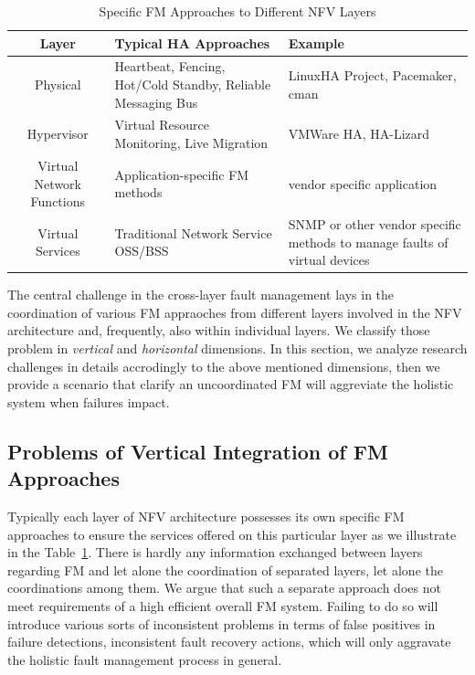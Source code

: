 \label{problemstatement}

\begin{table}[!t]
\centering
\caption{Specific FM Approaches to Different NFV Layers}
\label{tbl:layers}
	\begin{tabular}{c|p{3cm}|p{5cm}}
		\hline
		\textbf{Layer} & \textbf{Typical HA Approaches} & \textbf{Example}\\
		\hline
		\hline
		Physical	&	Heartbeat, Fencing, Hot/Cold Standby, Reliable Messaging Bus &
LinuxHA Project, Pacemaker, cman \\
		Hypervisor & Virtual Resource Monitoring, Live Migration & VMWare HA, HA-Lizard \\
		Virtual Network Functions & Application-specific FM methods & vendor
specific application \\
		Virtual Services & Traditional Network Service OSS/BSS & SNMP or other
vendor specific methods to manage faults of virtual devices \\
\hline
	\end{tabular}
\end{table} 
 
The central challenge in the cross-layer fault management lays in the coordination
of various FM appraoches from different layers involved in the NFV architecture
and, frequently, also within individual layers. We classify those problem in
\emph{vertical} and \emph{horizontal} dimensions. In this section, we analyze
research challenges in details accrodingly to the above mentioned dimensions,
then we provide a scenario that clarify an uncoordinated FM will aggreviate the
holistic system when failures impact. 

\subsection{Problems of Vertical Integration of FM Approaches} 

Typically each layer of NFV architecture possesses its own specific FM
approaches to ensure the services offered on this particular layer as we
illustrate in the Table~\ref{tbl:layers}. There is hardly any information
exchanged between layers regarding FM and let alone the coordination of
separated layers, let alone the coordinations among them. We argue that such a
separate approach does not meet requirements of a high efficient overall FM
system. Failing to do so will introduce various sorts of inconsistent problems
in terms of false positives in failure detections, inconsistent fault recovery
actions, which will only aggravate the holistic fault management process in general.

